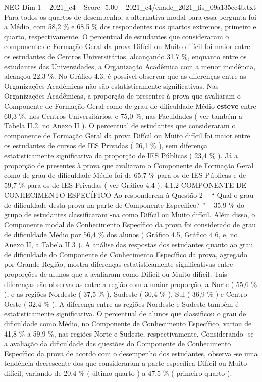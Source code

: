 \begin{textsample}{NEG Dim 1 – 2021\_c4 – Score -5.00 – 2021\_c4/enade\_2021\_fis\_09a135ec4b.txt}
Para todos os quartos de desempenho, a alternativa modal para essa pergunta foi a Médio, com 58,2 \% e 68,5 \% dos respondentes nos quartos extremos, primeiro e quarto, respectivamente.
O percentual de estudantes que consideraram o componente de Formação Geral da prova Difícil ou Muito difícil foi maior entre os estudantes de Centros Universitários, alcançando 31,7 \%, enquanto entre os estudantes das Universidades, a Organização Acadêmica com a menor incidência, alcançou 22,3 \%.
No Gráfico 4.3, é possível observar que as diferenças entre as Organizações Acadêmicas não são estatisticamente significativas.
Nas Organizações Acadêmicas, a proporção de presentes à prova que avaliaram o Componente de Formação Geral como de grau de dificuldade Médio \textbf{esteve} entre 60,3 \%, nos Centros Universitários, e 75,0 \%, nas Faculdades ( ver também a Tabela II.2, no Anexo II ).
O percentual de estudantes que consideraram o componente de Formação Geral da prova Difícil ou Muito difícil foi maior entre os estudantes de cursos de IES Privadas ( 26,1 \% ), sem diferença estatisticamente significativa da proporção de IES Públicas ( 23,4 \% ).
Já a proporção de presentes à prova que avaliaram o Componente de Formação Geral como de grau de dificuldade Médio foi de 65,7 \% para os de IES Públicas e de 59,7 \% para os de IES Privadas ( ver Gráfico 4.4 ). 4.1.2 COMPONENTE DE CONHECIMENTO ESPECÍFICO Ao responderem à Questão 2 – “ Qual o grau de dificuldade desta prova na parte de Componente Específico? ” – 35,9 \% do grupo de estudantes classificaram -na como Difícil ou Muito difícil.
Além disso, o Componente modal de Conhecimento Específico da prova foi considerado de grau de dificuldade Médio por 56,4 \% dos alunos ( Gráfico 4.5, Gráfico 4.6, e, no Anexo II, a Tabela II.3 ).
A análise das respostas dos estudantes quanto ao grau de dificuldade do Componente de Conhecimento Específico da prova, agregado por Grande Região, mostra diferenças estatisticamente significativas entre proporções de alunos que a avaliaram como Difícil ou Muito difícil.
Tais diferenças são observadas entre a região com a maior proporção, a Norte ( 55,6 \% ), e as regiões Nordeste ( 37,5 \% ), Sudeste ( 30,4 \% ), Sul ( 36,9 \% ) e Centro-Oeste ( 32,4 \% ).
A diferença entre as regiões Nordeste e Sudeste também é estatisticamente significativa.
O percentual de alunos que classificou o grau de dificuldade como Médio, no Componente de Conhecimento Específico, variou de 41,8 \% a 59,9 \%, nas regiões Norte e Sudeste, respectivamente.
Considerando -se a avaliação da dificuldade das questões do Componente de Conhecimento Específico da prova de acordo com o desempenho dos estudantes, observa -se uma tendência decrescente dos que consideraram a parte específica Difícil ou Muito difícil, variando de 20,4 \% ( último quarto ) a 47,5 \% ( primeiro quarto ).

\end{textsample}
